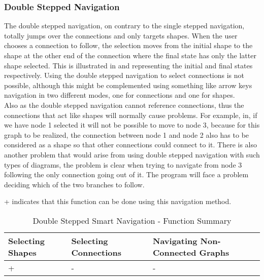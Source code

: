 \subsubsection {Double Stepped Navigation}
The double stepped navigation, on contrary to the single stepped navigation, totally jumps over the connections and only targets shapes. When the user chooses a connection to follow, the selection moves from the initial shape to the shape at the other end of the connection where the final state has only the latter shape selected. This is illustrated in and representing the initial and final states respectively. Using the double stepped navigation to select connections is not possible, although this might be complemented using something like arrow keys navigation in two different modes, one for connections and one for shapes.\\
Also as the double stepped navigation cannot reference connections, thus the connections that act like shapes will normally cause problems. For example, in, if we have node 1 selected it will not be possible to move to node 3, because for this graph to be realized, the connection between node 1 and node 2 also has to be considered as a shape so that other connections could connect to it. There is also another problem that would arise from using double stepped navigation with such types of diagrams, the problem is clear when trying to navigate from node 3 following the only connection going out of it. The program will face a problem deciding which of the two branches to follow.

\begin{table}[!htb]
\begin{center}
\begin{flushleft}
\footnotesize
{+ indicates that this function can be done using this navigation method.}\\
\normalsize
\end{flushleft}
	\begin{tabular}{| l | l | l |}
	\hline
	Selecting Shapes & Selecting Connections & Navigating Non-Connected Graphs \\ \hline
	+ & - & - \\ \hline
	\end{tabular}
\caption{Double Stepped Smart Navigation - Function Summary}
\end{center}
\end{table}

